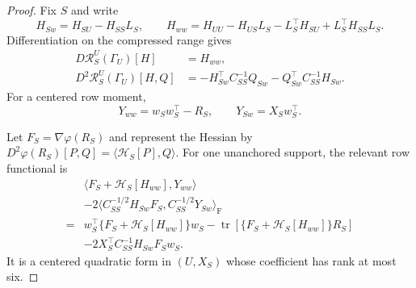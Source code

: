 \begin{proof}
Fix $S$ and write
\[
 H_{Sw}=H_{SU}-H_{SS}L_S,
 \qquad
 H_{ww}=H_{UU}-H_{US}L_S-L_S^\top H_{SU}
 +L_S^\top H_{SS}L_S.
\]
Differentiation on the compressed range gives
\begin{equation}\label{eq:residual-schur-derivatives}
\begin{split}
 D\mathcal R_S^U(\Gamma_U)[H]&=H_{ww},\\
 D^2\mathcal R_S^U(\Gamma_U)[H,Q]
 &=-H_{Sw}^\top C_{SS}^{-1}Q_{Sw}
 -Q_{Sw}^\top C_{SS}^{-1}H_{Sw}.
\end{split}
\end{equation}
For a centered row moment,
\begin{equation}\label{eq:row-residual-blocks}
 Y_{ww}=w_Sw_S^\top-R_S,
 \qquad Y_{Sw}=X_Sw_S^\top.
\end{equation}

Let $F_S=\nabla\varphi(R_S)$ and represent the Hessian by
$D^2\varphi(R_S)[P,Q]=\langle\mathcal H_S[P],Q\rangle$.  For one
unanchored support, the relevant row functional is
\begin{equation*}
\begin{split}
 &\langle F_S+\mathcal H_S[H_{ww}],Y_{ww}\rangle\\
 &-2\langle C_{SS}^{-1/2}H_{Sw}F_S,
 C_{SS}^{-1/2}Y_{Sw}\rangle_{\mathrm F}\\
 ={}&w_S^\top\{F_S+\mathcal H_S[H_{ww}]\}w_S
 -\operatorname{tr}[\{F_S+\mathcal H_S[H_{ww}]\}R_S]\\
 &-2X_S^\top C_{SS}^{-1}H_{Sw}F_Sw_S.
\end{split}
\end{equation*}
It is a centered quadratic form in $(U,X_S)$ whose coefficient has rank
at most six.


\end{proof}
